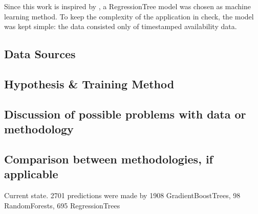Since this work is inspired by \cite{parkendd}, a RegressionTree model was chosen as machine learning method. To keep the complexity of the application in check, the model was kept simple: the data consisted only of timestamped availability data.

\subsection{Data Sources}\label{data sources}


\subsection{Hypothesis \& Training Method}\label{sec:training_model}


\subsection{Discussion of possible problems with data or methodology}
\subsection{Comparison between methodologies, if applicable}
Current state. 2701 predictions were made by 1908 GradientBoostTrees, 98 RandomForests, 695 RegressionTrees 
